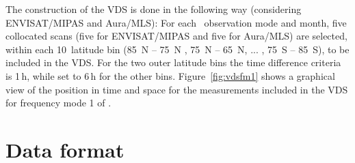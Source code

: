 The construction of the VDS is done in the following way (considering ENVISAT/MIPAS and Aura/MLS):
For each \smr\ observation mode and month, five collocated scans
(five for ENVISAT/MIPAS and five for Aura/MLS)  
are selected, within each 10\degree\ latitude bin
(85\degree\ N -- 75\degree\ N , 75\degree\ N -- 65\degree\ N, ... , 75\degree\ S -- 85\degree\ S),
to be included in the VDS. For the two outer latitude bins the
time difference criteria is 1\,h, while set to 6\,h for the other bins.  
Figure~\ref{fig:vdsfm1} shows a graphical view of the position in
time and space for the measurements included in the VDS for
frequency mode 1 of \smr.   




\section{Data format}
\label{sec:dataformat}
